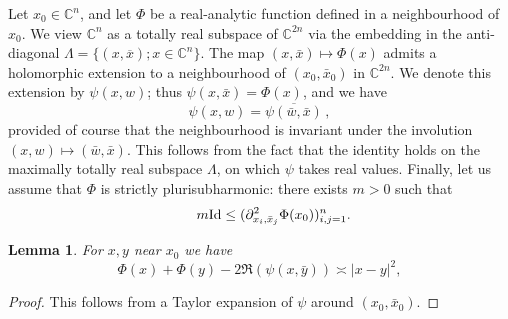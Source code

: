 \documentclass{article}
\newtheorem{lemm}[theo]{Lemma}
\newcommand{\CM}{\mathbb{C}}
\begin{document}
Let $x_0\in\CM^n$, and let $\Phi$ be a real-analytic function defined
in a neighbourhood of $x_0$.  We view $\CM^n$ as a totally real
subspace of $\CM^{2n}$ via the embedding in the anti-diagonal
$ \Lambda = \lbrace (x, \overline{x}); x \in \CM^n \rbrace$.  The map
$(x,\bar x) \mapsto \Phi(x)$ admits a holomorphic extension to a
neighbourhood of $(x_0,\bar x_0 )$ in $\CM^{2n}$. We denote this
extension by $\psi(x,w)$; thus $\psi(x,\bar x)=\Phi(x)$, and we have
\begin{equation}
  \psi(x, w) = \overline{\psi(\bar w, \bar{x})}\,,
  \label{equ:bar-psi}
\end{equation}
provided of course that the neighbourhood is invariant under the
involution $(x,w)\mapsto(\bar w, \bar x)$.  This follows from the fact
that the identity holds on the maximally totally real subspace
$\Lambda$, on which $\psi$ takes real values. Finally, let us assume
that $\Phi$ is strictly plurisubharmonic: there exists $m>0$ such that
\begin{equation}
  \qquad m\textup{Id} \leq ( \partial^2_{x_i,
    \bar{x}_j} \Phi(x_0) )_{i, j=1}^n.
  \label{equ:spsh}
\end{equation}

\begin{lemm}\label{lemm:phase-brg}
  For $x,y$ near $x_0$ we have
  \begin{equation}
    \Phi(x) + \Phi(y)  - 2 \Re \left( \psi(x, \bar{y}) \right) 
    \asymp |x-y|^2 ,
    \label{equ:estim-phi1}
  \end{equation} 
\end{lemm}
\begin{proof}
  This follows from a Taylor expansion of $\psi$ around
  $(x_0, \bar x_0)$.
\end{proof}
\end{document}
